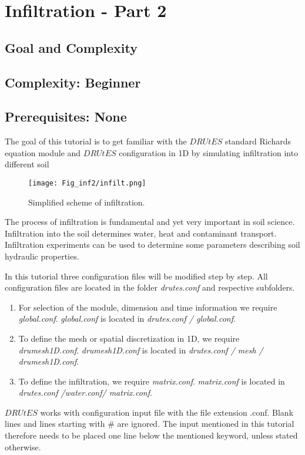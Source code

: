 \section{Infiltration - Part 2}
\subsection{Goal and Complexity}
\subsection*{Complexity: Beginner}

\subsection*{Prerequisites: None}

The goal of this tutorial is to get familiar with the $DRUtES$ standard Richards equation module and $DRUtES$ configuration in 1D by simulating infiltration into different soil \medskip

\begin{figure}[!h]
\centering
\texttt{[image: Fig\_inf2/infilt.png]}
\caption{Simplified scheme of infiltration.}
\end{figure}
The process of infiltration is fundamental and yet very important in soil science. Infiltration into the soil determines water, heat and contaminant transport. Infiltration experiments can be used to determine some parameters describing soil hydraulic properties. 

In this tutorial three configuration files will be modified step by step. All configuration files are located in the folder \emph{drutes.conf} and respective subfolders. \begin{enumerate}
\item For selection of the module, dimension and time information we require \emph{global.conf}.  \emph{global.conf} is located in \emph{drutes.conf / global.conf}. 
\item To define the mesh or spatial discretization in 1D,  we require \emph{drumesh1D.conf}. \emph{drumesh1D.conf} is located in \emph{drutes.conf / mesh / drumesh1D.conf}. 
\item To define the infiltration, we require \emph{matrix.conf}. \emph{matrix.conf} is located in \emph{drutes.conf /water.conf/ matrix.conf}. 
\end{enumerate}
$DRUtES$ works with configuration input file with the file extension .conf. Blank lines and lines starting with \# are ignored. The input mentioned in this tutorial therefore needs to be placed one line below the mentioned keyword, unless stated otherwise. 

